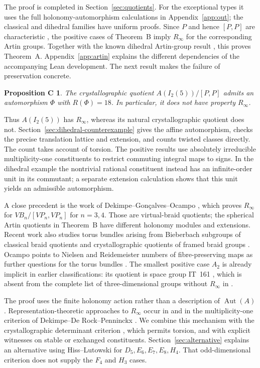 \documentclass[11pt]{amsart}
\newtheorem*{counterprop}{Proposition C}
\theoremstyle{definition}
\newcommand{\Aut}{\operatorname{Aut}}
\newcommand{\Rinf}{R_\infty}
\begin{document}
The proof is completed in Section~\ref{sec:quotients}. For the exceptional types it uses the full
holonomy-automorphism calculations in Appendix~\ref{app:out}; the classical and dihedral families have
uniform proofs. Since $P$ and hence $[P,P]$ are characteristic \cite{CP03}, the positive cases of Theorem~B
imply $\Rinf$ for the corresponding Artin groups. Together with the known dihedral Artin-group result
\cite{CS22}, this proves Theorem~A. Appendix~\ref{app:artin} explains the different dependencies of the accompanying Lean development.
The next result makes the failure of preservation concrete.

\begin{counterprop}
The crystallographic quotient $A(I_2(5))/[P,P]$ admits an automorphism $\Phi$ with $R(\Phi)=18$.
In particular, it does not have property $\Rinf$.
\end{counterprop}

Thus $A(I_2(5))$ has $\Rinf$, whereas its natural crystallographic quotient does not.
Section~\ref{sec:dihedral-counterexample} gives the affine automorphism, checks the precise translation lattice
and extension, and counts twisted classes directly. The count takes account of torsion.
The positive results use absolutely irreducible multiplicity-one constituents to restrict commuting integral
maps to signs. In the dihedral example the nontrivial rational constituent instead has an infinite-order unit
in its commutant; a separate extension calculation shows that this unit yields an admissible automorphism.

A close precedent is the work of Dekimpe--Gon\c{c}alves--Ocampo \cite[Thms.~28, 31 and proof of Cor.~32]{DGO24}, which proves
$\Rinf$ for $VB_n/[VP_n,VP_n]$ for $n=3,4$. Those are virtual-braid quotients; the spherical Artin quotients
in Theorem~B have different holonomy modules and extensions.
Recent work also studies torus bundles arising from Bieberbach subgroups of classical braid quotients
\cite{Oca26} and crystallographic quotients of framed braid groups \cite{LOST26}.
Ocampo points to Nielsen and Reidemeister numbers of fibre-preserving maps as further questions for
the torus bundles \cite[\S1]{Oca26}.
The smallest positive case $A_2$ is already implicit in earlier classifications: its quotient is space
group IT~161 \cite[\S5]{GGO17}, which is absent from the complete list of three-dimensional groups
without $\Rinf$ in \cite[Table~2]{DKT19}.

The proof uses the finite holonomy action rather than a description of $\Aut(A)$.
Representation-theoretic approaches to $\Rinf$ occur in \cite{DGO21} and in the multiplicity-one criterion
of Dekimpe--De Rock--Penninckx \cite[Thm.~4.7]{DDP09}. We combine this mechanism with the
crystallographic determinant criterion \cite[Cor.~3.10]{DP11}, which permits torsion, and with
explicit witnesses on stable or exchanged constituents. Section~\ref{sec:alternative} explains an
alternative using Hiss--Lutowski \cite{HL25,HL26} for $D_5,E_6,E_7,E_8,H_4$.
That odd-dimensional criterion does not supply the $F_4$ and $H_3$ cases.
\end{document}
